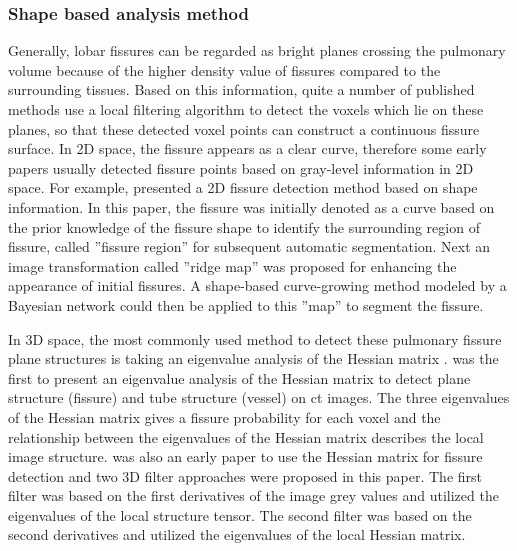 \subsubsection{Shape based analysis method}
Generally, lobar fissures can be regarded as bright planes crossing the pulmonary volume because of the higher density value of fissures compared to the surrounding tissues. Based on this information, quite a number of published methods use a local filtering algorithm to detect the voxels which lie on these planes, so that these detected voxel points can construct a continuous fissure surface. In 2D space, the fissure appears as a clear curve, therefore some early papers usually detected fissure points based on gray-level information in 2D space. For example, \cite{wang2004shape,wang2006pulmonary} presented a 2D fissure detection method based on shape information. In this paper, the fissure was initially denoted as a curve based on the prior knowledge of the fissure shape to identify the surrounding region of fissure, called ''fissure region'' for subsequent automatic segmentation. Next an image transformation called ''ridge map'' was proposed for enhancing the appearance of initial fissures. A shape-based curve-growing method modeled by a Bayesian network could then be applied to this ''map'' to segment the fissure.

In 3D space, the most commonly used method to detect these pulmonary fissure plane structures is taking an eigenvalue analysis of the Hessian matrix \citep{frangi1998multiscale,wiemker2005unsupervised,kitasaka2006recognition,ochs2007automated,van2008supervised,lassen2011interactive,lassen2013automatic,ross2010automatic,doel2012pulmonary}. \cite{frangi1998multiscale} was the first to present an eigenvalue analysis of the Hessian matrix to detect plane structure (fissure) and tube structure (vessel) on \gls{ct} images. The three eigenvalues of the Hessian matrix gives a fissure probability for each voxel and the relationship between the eigenvalues of the Hessian matrix describes the local image structure. \cite{wiemker2005unsupervised} was also an early paper to use the Hessian matrix for fissure detection and two 3D filter approaches were proposed in this paper. The first filter was based on the first derivatives of the image grey values and utilized the eigenvalues of the local structure tensor. The second filter was based on the second derivatives and utilized the eigenvalues of the local Hessian matrix. 

